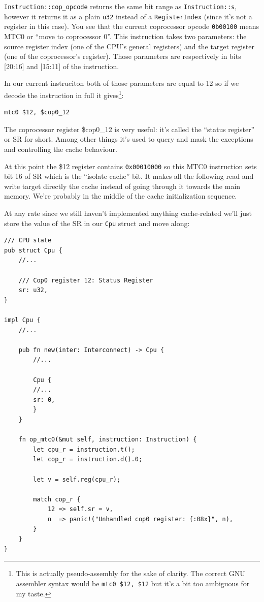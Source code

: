 \documentclass[a4paper]{article}
\newcommand{\code}[1] {\texttt{#1}}
\begin{document}
\code{Instruction::cop\_opcode} returns the same bit range as
\code{Instruction::s}, however it returns it as a plain \code{u32}
instead of a \code{RegisterIndex} (since it's not a register in this
case). You see that the current coprocessor opcode \code{0b00100} means
MTC0 or ``move to coprocessor 0''. This instruction takes two
parameters: the source register index (one of the CPU's general
registers) and the target register (one of the coprocessor's
register). Those parameters are respectively in bits [20:16] and
[15:11] of the instruction.

In our current instruciton both of those parameters are equal to 12 so
if we decode the instruction in full it gives\footnote{This is
  actually pseudo-assembly for the sake of clarity. The correct GNU
  assembler syntax would be \mbox{\code{mtc0 \$12, \$12}} but it's a
bit too ambiguous for my taste.}:

\begin{lstlisting}[language=assembly]
mtc0 $12, $cop0_12
\end{lstlisting}

The coprocessor register \$cop0\_12 is very useful: it's called the
``status register'' or SR for short. Among other things it's used to
query and mask the exceptions and controlling the cache behaviour.

At this point the \$12 register contains \code{0x00010000} so this
MTC0 instruction sets bit 16 of SR which is the ``isolate cache''
bit. It makes all the following read and write target directly the
cache instead of going through it towards the main memory. We're
probably in the middle of the cache initialization sequence.

At any rate since we still haven't implemented anything cache-related
we'll just store the value of the SR in our \code{Cpu} struct and
move along:

\begin{lstlisting}
/// CPU state
pub struct Cpu {
    //...

    /// Cop0 register 12: Status Register
    sr: u32,
}

impl Cpu {
    //...

    pub fn new(inter: Interconnect) -> Cpu {
        //...

        Cpu {
	    //...
	    sr: 0,
        }
    }

    fn op_mtc0(&mut self, instruction: Instruction) {
        let cpu_r = instruction.t();
        let cop_r = instruction.d().0;

        let v = self.reg(cpu_r);

        match cop_r {
            12 => self.sr = v,
            n  => panic!("Unhandled cop0 register: {:08x}", n),
        }
    }
}
\end{lstlisting}
\end{document}
